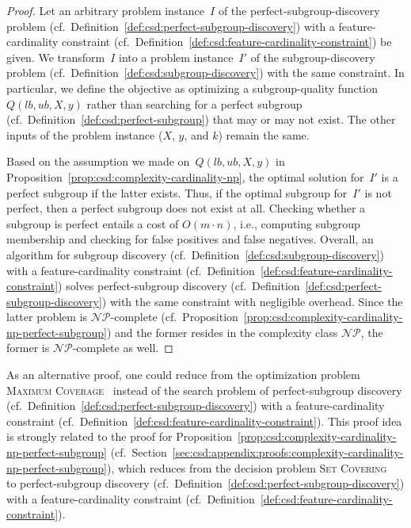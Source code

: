 \documentclass{article}
\theoremstyle{definition}
\begin{document}
\begin{proof}
Let an arbitrary problem instance~$I$ of the perfect-subgroup-discovery problem (cf.~Definition~\ref{def:csd:perfect-subgroup-discovery}) with a feature-cardinality constraint (cf.~Definition~\ref{def:csd:feature-cardinality-constraint}) be given.
We transform~$I$ into a problem instance~$I'$ of the subgroup-discovery problem (cf.~Definition~\ref{def:csd:subgroup-discovery}) with the same constraint.
In particular, we define the objective as optimizing a subgroup-quality function~$Q(\mathit{lb}, \mathit{ub}, X, y)$ rather than searching for a perfect subgroup (cf.~Definition~\ref{def:csd:perfect-subgroup}) that may or may not exist.
The other inputs of the problem instance ($X$, $y$, and $k$) remain the same.

Based on the assumption we made on~$Q(\mathit{lb}, \mathit{ub}, X, y)$ in Proposition~\ref{prop:csd:complexity-cardinality-np}, the optimal solution for~$I'$ is a perfect subgroup if the latter exists.
Thus, if the optimal subgroup for~$I'$ is not perfect, then a perfect subgroup does not exist at all.
Checking whether a subgroup is perfect entails a cost of $O(m \cdot n)$, i.e., computing subgroup membership and checking for false positives and false negatives.
Overall, an algorithm for subgroup discovery (cf.~Definition~\ref{def:csd:subgroup-discovery}) with a feature-cardinality constraint (cf.~Definition~\ref{def:csd:feature-cardinality-constraint}) solves perfect-subgroup discovery (cf.~Definition~\ref{def:csd:perfect-subgroup-discovery}) with the same constraint with negligible overhead.
Since the latter problem is $\mathcal{NP}$-complete (cf.~Proposition~\ref{prop:csd:complexity-cardinality-np-perfect-subgroup}) and the former resides in the complexity class $\mathcal{NP}$, the former is $\mathcal{NP}$-complete as well.
\end{proof}
%
As an alternative proof, one could reduce from the optimization problem \textsc{Maximum Coverage}~\cite{chekuri2004maximum} instead of the search problem of perfect-subgroup discovery (cf.~Definition~\ref{def:csd:perfect-subgroup-discovery}) with a feature-cardinality constraint (cf.~Definition~\ref{def:csd:feature-cardinality-constraint}).
This proof idea is strongly related to the proof for Proposition~\ref{prop:csd:complexity-cardinality-np-perfect-subgroup} (cf.~Section~\ref{sec:csd:appendix:proofs:complexity-cardinality-np-perfect-subgroup}), which reduces from the decision problem \textsc{Set Covering}~\cite{karp1972reducibility} to perfect-subgroup discovery (cf.~Definition~\ref{def:csd:perfect-subgroup-discovery}) with a feature-cardinality constraint (cf.~Definition~\ref{def:csd:feature-cardinality-constraint}).
\end{document}
